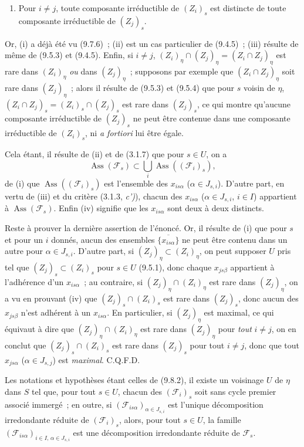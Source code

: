 \begin{enumerate}[label=\emph{(\roman*)}]
  \item[(iv)] Pour $i\neq j$, toute composante irréductible de $(Z_i)_s$ est
  distincte de toute composante irréductible de $(Z_j)_s$.
\end{enumerate}
Or, (i) a déjà été vu (9.7.6)~; (ii) est un cas particulier de (9.4.5)~; (iii)
résulte de même de (9.5.3) et (9.4.5). Enfin, si $i\neq j$,
$(Z_i)_\eta\cap(Z_j)_\eta=(Z_i\cap Z_j)_\eta$ est rare dans $(Z_i)_\eta$ \emph{ou}
dans $(Z_j)_\eta$~; supposons par exemple que $(Z_i\cap Z_j)_\eta$ soit rare
dans $(Z_j)_\eta$~; alors il résulte de (9.5.3) et (9.5.4) que pour $s$ voisin
de $\eta$, $(Z_i\cap Z_j)_s=(Z_i)_s\cap(Z_j)_s$ est rare dans $(Z_j)_s$, ce qui
montre qu'aucune composante irréductible de $(Z_j)_s$ ne peut être contenue
dans une composante irréductible de $(Z_i)_s$, ni \emph{a fortiori} lui être
égale.

Cela étant, il résulte de (ii) et de (3.1.7) que pour $s\in U$, on a
\[
\operatorname{Ass}(\mathcal F_s)\subset
\bigcup_i\operatorname{Ass}((\mathcal F_i)_s),
\]
de (i) que $\operatorname{Ass}((\mathcal F_i)_s)$ est l'ensemble des
$x_{is\alpha}$ ($\alpha\in J_{s,i}$). D'autre part, en vertu de (iii) et du
critère (3.1.3, \emph{c')}), chacun des $x_{is\alpha}$ ($\alpha\in J_{s,i}$,
$i\in I$) appartient à $\operatorname{Ass}(\mathcal F_s)$. Enfin (iv) signifie
que les $x_{is\alpha}$ sont deux à deux distincts.

Reste à prouver la dernière assertion de l'énoncé. Or, il résulte de (i) que
pour $s$ et pour un $i$ donnés, aucun des ensembles $\overline{\{x_{is\alpha}\}}$ ne peut
être contenu dans un autre pour $\alpha\in J_{s,i}$. D'autre part, si
$(Z_j)_\eta\subset(Z_i)_\eta$, on peut supposer $U$ pris tel que
$(Z_j)_s\subset(Z_i)_s$ pour $s\in U$ (9.5.1), donc chaque $x_{js\beta}$
appartient à l'adhérence d'un $x_{is\alpha}$~; au contraire, si
$(Z_j)_\eta\cap(Z_i)_\eta$ est rare dans $(Z_j)_\eta$, on a vu en prouvant (iv)
que $(Z_j)_s\cap(Z_i)_s$ est rare dans $(Z_j)_s$, donc aucun des $x_{js\beta}$
n'est adhérent à un $x_{is\alpha}$. En particulier, si $(Z_j)_\eta$ est
maximal, ce qui équivaut à dire que $(Z_j)_\eta\cap(Z_i)_\eta$ est rare dans
$(Z_j)_\eta$ pour \emph{tout} $i\neq j$, on en conclut que
$(Z_j)_s\cap(Z_i)_s$ est rare dans $(Z_j)_s$ pour tout $i\neq j$, donc que tout
$x_{js\alpha}$ ($\alpha\in J_{s,j}$) est \emph{maximal}. C.Q.F.D.

\begin{corollary}[9.8.4]
\label{IV.9.8.4-fr}
Les notations et hypothèses étant celles de \textup{(9.8.2)}, il existe un voisinage $U$
de $\eta$ dans $S$ tel que, pour tout $s\in U$, chacun des $(\mathcal F_i)_s$
soit sans cycle premier associé immergé~; en outre, si
$(\mathcal F_{is\alpha})_{\alpha\in J_{s,i}}$ est l'unique décomposition
irredondante réduite de $(\mathcal F_i)_s$, alors, pour tout $s\in U$, la
famille $(\mathcal F_{is\alpha})_{i\in I,\,\alpha\in J_{s,i}}$ est une
décomposition irredondante réduite de $\mathcal F_s$.
\end{corollary}

